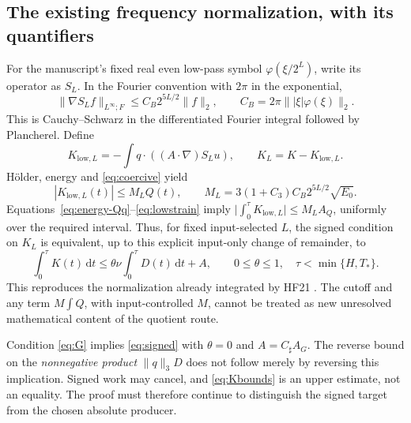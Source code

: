 \documentclass[11pt,a4paper]{article}
\theoremstyle{definition}
\theoremstyle{remark}
\newcommand{\dd}{\,\mathrm d}
\newcommand{\norm}[1]{\lVert #1\rVert}
\numberwithin{equation}{section}
\begin{document}
\subsection{The existing frequency normalization, with its quantifiers}
For the manuscript's fixed real even low-pass symbol \(\varphi(\xi/2^L)\), write its operator as \(S_L\). In the Fourier convention with \(2\pi\) in the exponential,
\[
\norm{\nabla S_L f}_{L^\infty;F}\le C_B2^{5L/2}\norm f_2,
\qquad C_B=2\pi\norm{|\xi|\varphi(\xi)}_2.
\]
This is Cauchy--Schwarz in the differentiated Fourier integral followed by Plancherel. Define
\[
K_{\mathrm{low},L}=-\int q\cdot((A\cdot\nabla)S_Lu),
\qquad K_L=K-K_{\mathrm{low},L}.
\]
Hölder, energy and \eqref{eq:coercive} yield
\begin{equation}\label{eq:lowstrain}
|K_{\mathrm{low},L}(t)|\le M_LQ(t),
\qquad M_L=3(1+C_3)C_B2^{5L/2}\sqrt{E_0}.
\end{equation}
Equations~\eqref{eq:energy-Qq}--\eqref{eq:lowstrain} imply
\(\big|\int_0^\tau K_{\mathrm{low},L}\big|\le M_LA_Q\), uniformly over the required interval. Thus, for fixed input-selected \(L\), the signed condition on \(K_L\) is equivalent, up to this explicit input-only change of remainder, to
\begin{equation}\label{eq:signed}
\int_0^\tau K(t)\dd t
\le\theta\nu\int_0^\tau D(t)\dd t+A,
\qquad 0\le\theta\le1,
\quad \tau<\min\{H,T_*\}.
\end{equation}
This reproduces the normalization already integrated by HF21 \cite{Paper,Research}. The cutoff and any term \(M\int Q\), with input-controlled \(M\), cannot be treated as new unresolved mathematical content of the quotient route.

Condition \eqref{eq:G} implies \eqref{eq:signed} with \(\theta=0\) and \(A=C_\sharp A_G\). The reverse bound on the \emph{nonnegative product} \(\norm q_3D\) does not follow merely by reversing this implication. Signed work may cancel, and \eqref{eq:Kbounds} is an upper estimate, not an equality. The proof must therefore continue to distinguish the signed target from the chosen absolute producer.
\end{document}

